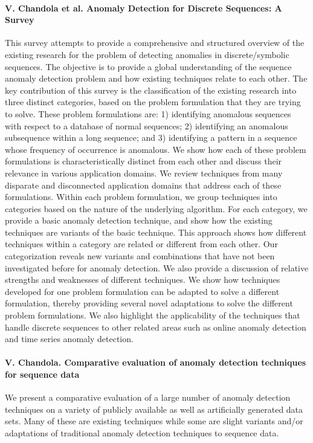 \paragraph*{V. Chandola et al. Anomaly Detection for Discrete Sequences: A Survey}\cite{chandola2012anomaly}
This survey attempts to provide a comprehensive and structured overview of the existing research for the problem of detecting anomalies in discrete/symbolic sequences. The objective is to provide a global understanding of the sequence anomaly detection problem and how existing techniques relate to each other. The key contribution of this survey is the classification of the existing research into three distinct categories, based on the problem formulation that they are trying to solve. These problem formulations are: 1) identifying anomalous sequences with respect to a database of normal sequences; 2) identifying an anomalous subsequence within a long sequence; and 3) identifying a pattern in a sequence whose frequency of occurrence is anomalous. We show how each of these problem formulations is characteristically distinct from each other and discuss their relevance in various application domains. We review techniques from many disparate and disconnected application domains that address each of these formulations. Within each problem formulation, we group techniques into categories based on the nature of the underlying algorithm. For each category, we provide a basic anomaly detection technique, and show how the existing techniques are variants of the basic technique. This approach shows how different techniques within a category are related or different from each other. Our categorization reveals new variants and combinations that have not been investigated before for anomaly detection. We also provide a discussion of relative strengths and weaknesses of different techniques. We show how techniques developed for one problem formulation can be adapted to solve a different formulation, thereby providing several novel adaptations to solve the different problem formulations. We also highlight the applicability of the techniques that handle discrete sequences to other related areas such as online anomaly detection and time series anomaly detection.

\paragraph*{V. Chandola. Comparative evaluation of anomaly detection techniques for sequence data}\cite{chandola2008comparative} We present a comparative evaluation of a large number of anomaly detection techniques on a variety of publicly available as well as artificially generated data sets. Many of these are existing techniques while some are slight variants and/or adaptations of traditional anomaly detection techniques to sequence data.


